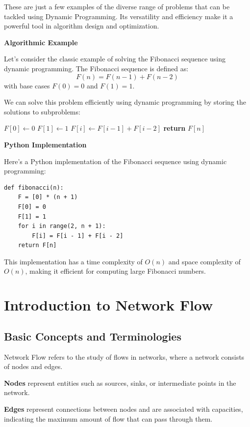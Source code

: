 \documentclass[12pt]{book} %
\begin{document}
These are just a few examples of the diverse range of problems that can be tackled using Dynamic Programming. Its versatility and efficiency make it a powerful tool in algorithm design and optimization.

\textbf{Algorithmic Example}

Let's consider the classic example of solving the Fibonacci sequence using dynamic programming. The Fibonacci sequence is defined as:
\[ F(n) = F(n-1) + F(n-2) \]
with base cases \( F(0) = 0 \) and \( F(1) = 1 \).

We can solve this problem efficiently using dynamic programming by storing the solutions to subproblems:
\FloatBarrier
\begin{algorithm}
\caption{Dynamic Programming for Fibonacci Sequence}\label{fib_dp}
\begin{algorithmic}[1]
\State $F[0] \gets 0$
\State $F[1] \gets 1$
\State $F[i] \gets F[i-1] + F[i-2]$
\EndFor
\State \textbf{return} $F[n]$
\EndProcedure
\end{algorithmic}
\end{algorithm}
\FloatBarrier
\textbf{Python Implementation}

Here's a Python implementation of the Fibonacci sequence using dynamic programming:
\FloatBarrier
\begin{lstlisting}
def fibonacci(n):
    F = [0] * (n + 1)
    F[0] = 0
    F[1] = 1
    for i in range(2, n + 1):
        F[i] = F[i - 1] + F[i - 2]
    return F[n]
\end{lstlisting}
\FloatBarrier
This implementation has a time complexity of \( O(n) \) and space complexity of \( O(n) \), making it efficient for computing large Fibonacci numbers.


\section{Introduction to Network Flow}

\subsection{Basic Concepts and Terminologies}
Network Flow refers to the study of flows in networks, where a network consists of nodes and edges. 

\textbf{Nodes} represent entities such as sources, sinks, or intermediate points in the network.

\textbf{Edges} represent connections between nodes and are associated with capacities, indicating the maximum amount of flow that can pass through them.
\end{document}
